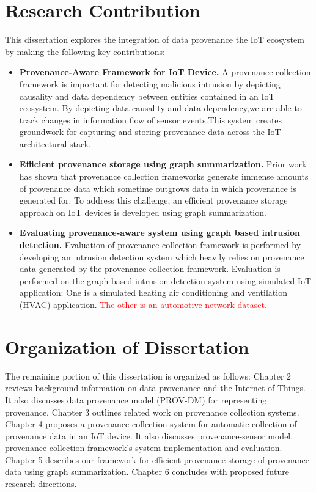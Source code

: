 \section{Research Contribution}

This dissertation explores the integration of data provenance the IoT ecosystem by making the following key contributions:

\begin{itemize}
  \item \textbf{Provenance-Aware Framework for IoT Device.} A provenance collection framework is important for detecting malicious intrusion by depicting causality and data dependency between entities contained in an IoT ecosystem. By depicting data causality and data dependency,we are able to track changes in information flow of sensor events.This system creates groundwork for capturing and storing provenance data  across the IoT architectural stack.
  
  \item\textbf{Efficient provenance storage using graph summarization.} Prior work has shown that provenance collection frameworks generate immense amounts of provenance data which sometime outgrows data in which provenance is generated for. To address this challenge, an efficient provenance storage approach on IoT devices is developed using graph summarization. 
  
  \item \textbf{Evaluating provenance-aware system using graph based intrusion detection.} Evaluation of provenance collection framework is performed by developing an intrusion detection system which heavily relies on provenance data generated by the provenance collection framework. Evaluation is performed on the graph based intrusion detection system using simulated IoT application: One is a simulated heating air conditioning and ventilation (HVAC) application. \textcolor{red}{The other is an automotive network dataset.}
\end{itemize}

\section{Organization of Dissertation}

The remaining portion of this dissertation is organized as follows: Chapter 2 reviews background information on data provenance and the Internet of Things. It also discusses data provenance model (PROV-DM) for representing provenance. Chapter 3  outlines related work on provenance collection systems. Chapter 4 proposes a provenance collection system for automatic collection of provenance data in an IoT device. It also discusses provenance-sensor model, provenance collection framework's system implementation and evaluation. Chapter 5 describes our framework for efficient provenance storage of provenance data using graph summarization. Chapter 6 concludes with proposed future research directions.

